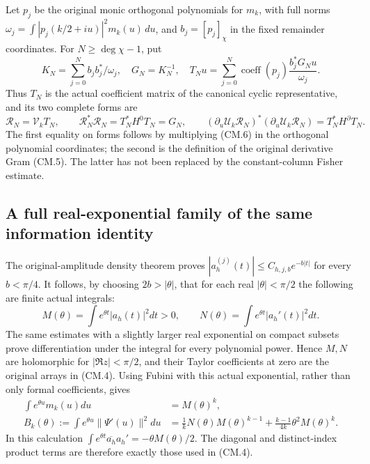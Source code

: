 Let \(p_j\) be the original monic orthogonal polynomials for \(m_k\),
with full norms
\(\omega_j=\int|p_j(k/2+iu)|^2m_k(u)\,du\), and
\(b_j=[p_j]_\chi\) in the fixed
remainder coordinates. For \(N\ge\deg\chi-1\), put
\[
 K_N=\sum_{j=0}^N b_jb_j^*/\omega_j,\quad G_N=K_N^{-1},\quad
 T_Nu=\sum_{j=0}^N\operatorname{coeff}(p_j)
                             \frac{b_j^*G_Nu}{\omega_j}.
 \tag{CM.6}
\]
Thus \(T_N\) is the actual coefficient matrix of the canonical
cyclic representative, and its two complete forms are
\[
 \mathcal R_N=\mathcal V_k T_N,\qquad
 \mathcal R_N^*\mathcal R_N=T_N^*H^0T_N=G_N,\qquad
 (\partial_u\mathscr U_k\mathcal R_N)^*
          (\partial_u\mathscr U_k\mathcal R_N)=T_N^*H^\partial T_N.
 \tag{CM.7}
\]
The first equality on forms follows by multiplying (CM.6) in the
orthogonal polynomial coordinates; the second is the definition of the
original derivative Gram (CM.5). The latter has not been replaced by
the constant-column Fisher estimate.

\subsection{A full real-exponential family of the same information identity}

The original-amplitude density theorem proves
\(|a_h^{(j)}(t)|\le C_{h,j,b}e^{-b|t|}\) for every \(b<\pi/4\).
It follows, by choosing \(2b>|\theta|\), that for each real
\(|\theta|<\pi/2\) the following are finite actual integrals:
\[
 M(\theta)=\int e^{\theta t}|a_h(t)|^2dt>0,\qquad
 N(\theta)=\int e^{\theta t}|a_h'(t)|^2dt.
 \tag{CM.8}
\]
The same estimates with a slightly larger real exponential on compact
subsets prove differentiation under the integral for every polynomial
power. Hence \(M,N\) are holomorphic for \(|\Re z|<\pi/2\), and
their Taylor coefficients at zero are the original arrays in (CM.4).
Using Fubini with this actual exponential, rather than only formal
coefficients, gives
\[
 \begin{aligned}
 \int e^{\theta u}m_k(u)du&=M(\theta)^k,\\
 B_k(\theta):=\int e^{\theta u}\|\Psi'(u)\|^2du
   &=\frac1k N(\theta)M(\theta)^{k-1}
               +\frac{k-1}{4k}\theta^2M(\theta)^k.
 \end{aligned}
 \tag{CM.9}
\]
In this calculation
\(\int e^{\theta t}\overline{a_h}a_h'
=-\theta M(\theta)/2\). The diagonal and distinct-index product
terms are therefore exactly those used in (CM.4).

